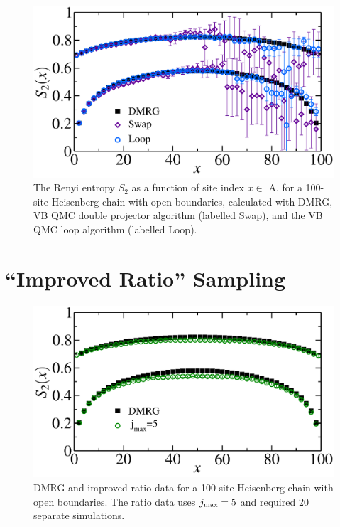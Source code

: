 \begin{figure} {
	\includegraphics[width=6in]{./figures/paper2/fig_1D/loopfig.pdf} 
	\caption[$S_2$ for a 100-site chain using double projector VB QMC, loop algorithm VB QMC and DMRG]{ 
	\label{loopfig}
The Renyi entropy $S_2$ as a function of site index $x \in $ A, for a 100-site Heisenberg chain with open boundaries, 
calculated with DMRG, VB QMC double projector algorithm (labelled Swap), and the VB QMC loop algorithm (labelled Loop).
}
}\end{figure}


	

\section{``Improved Ratio'' Sampling}


\begin{figure} {
	\includegraphics[width=6in]{./figures/paper2/fig_1D/ratiofig.pdf} 
	\centering
	\caption[$S_2$ for a 100-site chain using double projector VB QMC ration data and DMRG]{ 
	\label{ratiofig}
	DMRG and improved ratio data for a 100-site Heisenberg chain with open boundaries.
The ratio data uses $j_{\rm max}=5$ and required 20 separate simulations.
	}
}\end{figure}

